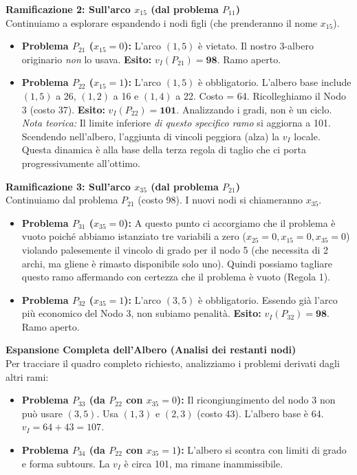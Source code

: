 \documentclass[12pt, a4paper]{article}
\begin{document}
	\textbf{Ramificazione 2: Sull'arco $x_{15}$ (dal problema $P_{11}$)}\\
	Continuiamo a esplorare espandendo i nodi figli (che prenderanno il nome $x_{15}$).
	\begin{itemize}[label=\textcolor{titlecolor}{\Large\textbullet}, itemsep=2pt, leftmargin=1.5cm]
		\item \textbf{Problema $P_{21}$ ($x_{15} = 0$):} L'arco $(1,5)$ è vietato. Il nostro 3-albero originario \textit{non} lo usava.
		\textbf{Esito:} $v_I(P_{21}) = \mathbf{98}$. Ramo aperto.
		\item \textbf{Problema $P_{22}$ ($x_{15} = 1$):} L'arco $(1,5)$ è obbligatorio.
		L'albero base include $(1,5)$ a 26, $(1,2)$ a 16 e $(1,4)$ a 22. Costo = 64.
		Ricolleghiamo il Nodo 3 (costo 37). \textbf{Esito:} $v_I(P_{22}) = \mathbf{101}$. Analizzando i gradi, non è un ciclo. 
		\textit{Nota teorica:} Il limite inferiore \textit{di questo specifico ramo} si aggiorna a 101. Scendendo nell'albero, l'aggiunta di vincoli peggiora (alza) la $v_I$ locale. Questa dinamica è alla base della terza regola di taglio che ci porta progressivamente all'ottimo.
	\end{itemize}
	
	\textbf{Ramificazione 3: Sull'arco $x_{35}$ (dal problema $P_{21}$)}\\
	Continuiamo dal problema $P_{21}$ (costo 98). I nuovi nodi si chiameranno $x_{35}$.
	\begin{itemize}[label=\textcolor{titlecolor}{\Large\textbullet}, itemsep=2pt, leftmargin=1.5cm]
		\item \textbf{Problema $P_{31}$ ($x_{35} = 0$):} A questo punto ci accorgiamo che il problema è vuoto poiché abbiamo istanziato tre variabili a zero ($x_{25}=0, x_{15}=0, x_{35}=0$) violando palesemente il vincolo di grado per il nodo 5 (che necessita di 2 archi, ma gliene è rimasto disponibile solo uno). Quindi possiamo tagliare questo ramo affermando con certezza che il problema è vuoto (Regola 1).
		\item \textbf{Problema $P_{32}$ ($x_{35} = 1$):} L'arco $(3,5)$ è obbligatorio. Essendo già l'arco più economico del Nodo 3, non subiamo penalità. 
		\textbf{Esito:} $v_I(P_{32}) = \mathbf{98}$. Ramo aperto.
	\end{itemize}
	
	\vspace{0.4cm}
	\textbf{Espansione Completa dell'Albero (Analisi dei restanti nodi)}\\
	Per tracciare il quadro completo richiesto, analizziamo i problemi derivati dagli altri rami:
	\begin{itemize}[label=$\circ$, itemsep=2pt, leftmargin=1.5cm]
		\item \textbf{Problema $P_{33}$ (da $P_{22}$ con $x_{35}=0$):} Il ricongiungimento del nodo 3 non può usare $(3,5)$. Usa $(1,3)$ e $(2,3)$ (costo 43). L'albero base è 64. $v_I = 64+43 = 107$.
		\item \textbf{Problema $P_{34}$ (da $P_{22}$ con $x_{35}=1$):} L'albero si scontra con limiti di grado e forma subtours. La $v_I$ è circa 101, ma rimane inammissibile.
	\end{itemize}
	
\end{document}
